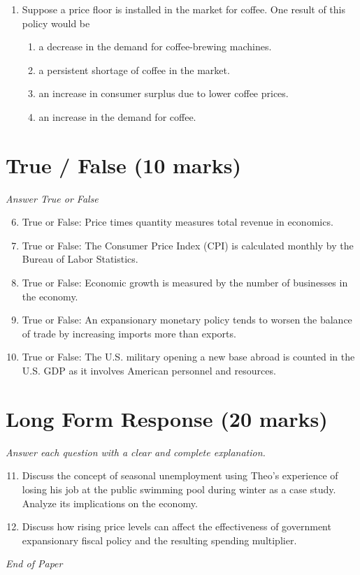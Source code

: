 \documentclass[12pt]{article}
\begin{document}
\begin{enumerate}[label=\arabic*.]
\begin{enumerate}[label=(\alph*)]
    \item Differentiated products
    \item Patents and copyrights
    \item Possibility of profit in the short run
    \item Deadweight loss exists
\end{enumerate}
\item Suppose a price floor is installed in the market for coffee. One result of this policy would be
\begin{enumerate}[label=(\alph*)]
    \item a decrease in the demand for coffee-brewing machines.
    \item a persistent shortage of coffee in the market.
    \item an increase in consumer surplus due to lower coffee prices.
    \item an increase in the demand for coffee.
\end{enumerate}
\end{enumerate}

\section*{True / False (10 marks)}
\textit{Answer True or False}
\begin{enumerate}[label=\arabic*.]
\setcounter{enumi}{5}
\item True or False: Price times quantity measures total revenue in economics.
\item True or False: The Consumer Price Index (CPI) is calculated monthly by the Bureau of Labor Statistics.
\item True or False: Economic growth is measured by the number of businesses in the economy.
\item True or False: An expansionary monetary policy tends to worsen the balance of trade by increasing imports more than exports.
\item True or False: The U.S. military opening a new base abroad is counted in the U.S. GDP as it involves American personnel and resources.
\end{enumerate}

\section*{Long Form Response (20 marks)}
\textit{Answer each question with a clear and complete explanation.}
\begin{enumerate}[label=\arabic*.]
\setcounter{enumi}{10}
\item Discuss the concept of seasonal unemployment using Theo's experience of losing his job at the public swimming pool during winter as a case study. Analyze its implications on the economy.
\item Discuss how rising price levels can affect the effectiveness of government expansionary fiscal policy and the resulting spending multiplier.
\end{enumerate}

\vfill
\noindent\textit{End of Paper}
\end{document}
